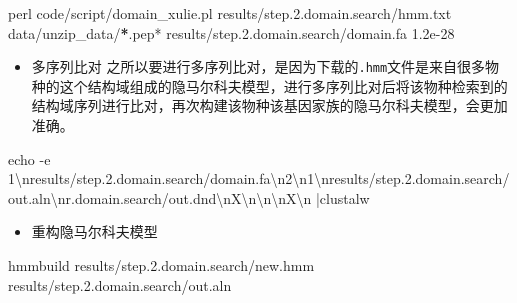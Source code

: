\documentclass[
  10pt,
]{book}
\newenvironment{Shaded}{\begin{snugshade}}{\end{snugshade}}
\newcommand{\ErrorTok}[1]{\textcolor[rgb]{0.64,0.00,0.00}{\textbf{#1}}}
\newcommand{\FloatTok}[1]{\textcolor[rgb]{0.00,0.00,0.81}{#1}}
\newcommand{\NormalTok}[1]{#1}
\newcommand{\SpecialCharTok}[1]{\textcolor[rgb]{0.00,0.00,0.00}{#1}}
\newcommand{\StringTok}[1]{\textcolor[rgb]{0.31,0.60,0.02}{#1}}
\providecommand{\tightlist}{%
  \setlength{\itemsep}{0pt}\setlength{\parskip}{0pt}}
\begin{document}
\begin{Shaded}
\begin{Highlighting}[]
\NormalTok{perl code}\SpecialCharTok{/}\NormalTok{script}\SpecialCharTok{/}\NormalTok{domain\_xulie.pl results}\SpecialCharTok{/}\NormalTok{step.}\FloatTok{2.}\NormalTok{domain.search}\SpecialCharTok{/}\NormalTok{hmm.txt data}\SpecialCharTok{/}\NormalTok{unzip\_data}\SpecialCharTok{/}\ErrorTok{*}\NormalTok{.pep}\SpecialCharTok{*}\NormalTok{ results}\SpecialCharTok{/}\NormalTok{step.}\FloatTok{2.}\NormalTok{domain.search}\SpecialCharTok{/}\NormalTok{domain.fa }\FloatTok{1.2e{-}28}
\end{Highlighting}
\end{Shaded}

\begin{itemize}
\tightlist
\item
  多序列比对
  之所以要进行多序列比对，是因为下载的\texttt{.hmm}文件是来自很多物种的这个结构域组成的隐马尔科夫模型，进行多序列比对后将该物种检索到的结构域序列进行比对，再次构建该物种该基因家族的隐马尔科夫模型，会更加准确。
\end{itemize}

\begin{Shaded}
\begin{Highlighting}[]
\NormalTok{echo }\SpecialCharTok{{-}}\NormalTok{e }\StringTok{\textquotesingle{}1}\SpecialCharTok{\textbackslash{}n}\StringTok{results/step.2.domain.search/domain.fa}\SpecialCharTok{\textbackslash{}n}\StringTok{2}\SpecialCharTok{\textbackslash{}n}\StringTok{1}\SpecialCharTok{\textbackslash{}n}\StringTok{results/step.2.domain.search/out.aln}\SpecialCharTok{\textbackslash{}n}\StringTok{r.domain.search/out.dnd}\SpecialCharTok{\textbackslash{}n}\StringTok{X}\SpecialCharTok{\textbackslash{}n\textbackslash{}n\textbackslash{}n}\StringTok{X}\SpecialCharTok{\textbackslash{}n}\StringTok{\textquotesingle{}} \SpecialCharTok{|}\NormalTok{clustalw}
\end{Highlighting}
\end{Shaded}

\begin{itemize}
\tightlist
\item
  重构隐马尔科夫模型
\end{itemize}

\begin{Shaded}
\begin{Highlighting}[]
\NormalTok{hmmbuild results}\SpecialCharTok{/}\NormalTok{step.}\FloatTok{2.}\NormalTok{domain.search}\SpecialCharTok{/}\NormalTok{new.hmm results}\SpecialCharTok{/}\NormalTok{step.}\FloatTok{2.}\NormalTok{domain.search}\SpecialCharTok{/}\NormalTok{out.aln}
\end{Highlighting}
\end{Shaded}
\end{document}
